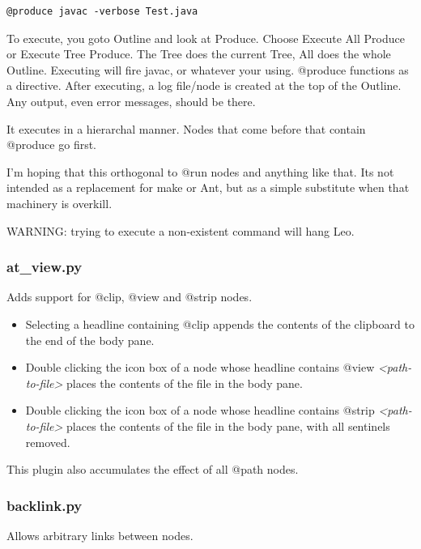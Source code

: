\documentclass[a4paper,10pt,english]{sphinxmanual}
\begin{document}
\begin{Verbatim}[commandchars=\\\{\}]
@produce javac -verbose Test.java
\end{Verbatim}

To execute, you goto Outline and look at Produce.  Choose Execute All Produce
or Execute Tree Produce.  The Tree does the current Tree, All does the whole
Outline.  Executing will fire javac, or whatever your using.  @produce functions
as a directive.  After executing, a log file/node is created at the top of the
Outline.  Any output, even error messages, should be there.

It executes in a hierarchal manner.  Nodes that come before that contain @produce
go first.

I'm hoping that this orthogonal to @run nodes and anything like that.  Its not
intended as a replacement for make or Ant, but as a simple substitute when that
machinery is overkill.

WARNING: trying to execute a non-existent command will hang Leo.


\subsubsection{at\_view.py}
\label{plugins:at-view-py}
Adds support for @clip, @view and @strip nodes.
\begin{itemize}
\item {} 
Selecting a headline containing @clip appends the contents of the clipboard to
the end of the body pane.

\item {} 
Double clicking the icon box of a node whose headline contains @view
\emph{\textless{}path-to-file\textgreater{}} places the contents of the file in the body pane.

\item {} 
Double clicking the icon box of a node whose headline contains @strip
\emph{\textless{}path-to-file\textgreater{}} places the contents of the file in the body pane, with all
sentinels removed.

\end{itemize}

This plugin also accumulates the effect of all @path nodes.


\subsubsection{backlink.py}
\label{plugins:backlink-py}
Allows arbitrary links between nodes.
\end{document}
